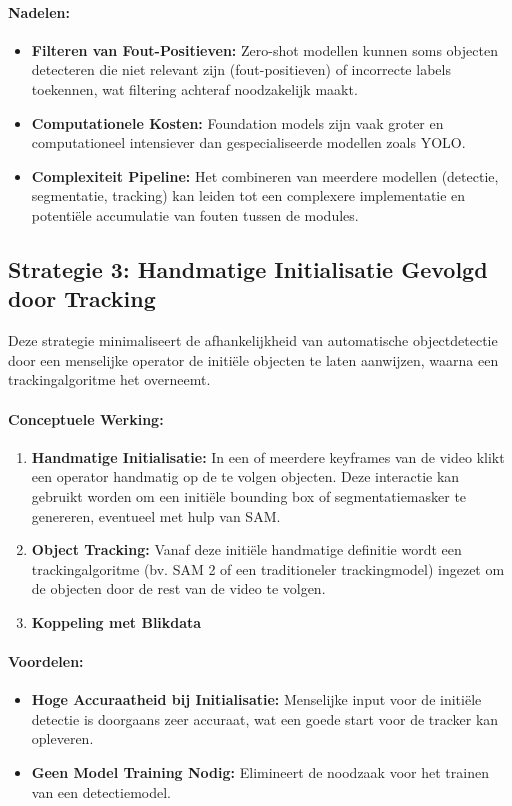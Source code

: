 \paragraph{Nadelen:}
\begin{itemize}
    \item \textbf{Filteren van Fout-Positieven:} Zero-shot modellen kunnen soms objecten detecteren die niet relevant zijn (fout-positieven) of incorrecte labels toekennen, wat filtering achteraf noodzakelijk maakt.
    \item \textbf{Computationele Kosten:} Foundation models zijn vaak groter en computationeel intensiever dan gespecialiseerde modellen zoals YOLO.
    \item \textbf{Complexiteit Pipeline:} Het combineren van meerdere modellen (detectie, segmentatie, tracking) kan leiden tot een complexere implementatie en potentiële accumulatie van fouten tussen de modules.
\end{itemize}

\subsection{Strategie 3: Handmatige Initialisatie Gevolgd door Tracking}

Deze strategie minimaliseert de afhankelijkheid van automatische objectdetectie door een menselijke operator de initiële objecten te laten aanwijzen, waarna een trackingalgoritme het overneemt.

\paragraph{Conceptuele Werking:}
\begin{enumerate}
    \item \textbf{Handmatige Initialisatie:} In een of meerdere keyframes van de video klikt een operator handmatig op de te volgen objecten. Deze interactie kan gebruikt worden om een initiële bounding box of segmentatiemasker te genereren, eventueel met hulp van SAM.
    \item \textbf{Object Tracking:} Vanaf deze initiële handmatige definitie wordt een trackingalgoritme (bv. SAM 2 of een traditioneler trackingmodel) ingezet om de objecten door de rest van de video te volgen.
    \item \textbf{Koppeling met Blikdata}
\end{enumerate}

\paragraph{Voordelen:}
\begin{itemize}
    \item \textbf{Hoge Accuraatheid bij Initialisatie:} Menselijke input voor de initiële detectie is doorgaans zeer accuraat, wat een goede start voor de tracker kan opleveren.
    \item \textbf{Geen Model Training Nodig:} Elimineert de noodzaak voor het trainen van een detectiemodel.
\end{itemize}

